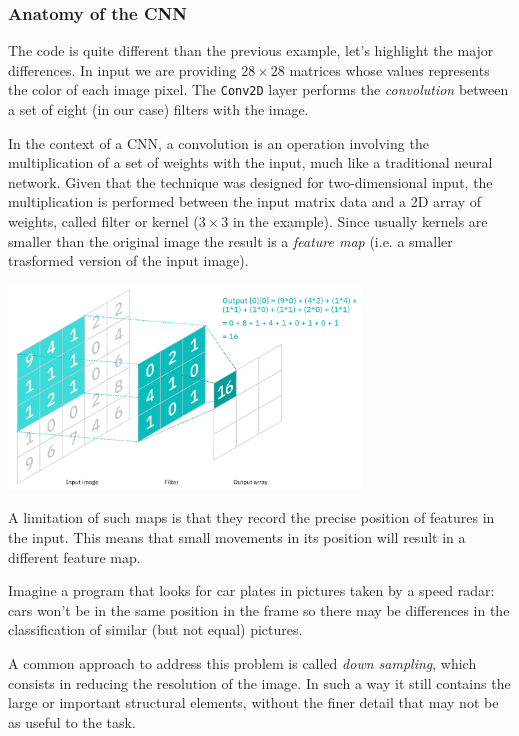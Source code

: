 \begin{attention}
\subsubsection{Anatomy of the CNN}

The code is quite different than the previous example, let's highlight the major differences.
In input we are providing $28\times 28$ matrices whose values represents the color of each image pixel. 
The \texttt{Conv2D} layer performs the \emph{convolution} between a set of eight (in our case) filters with the image. 

In the context of a CNN, a convolution is an operation involving the multiplication of a set of weights with the input, much like a traditional neural network. Given that the technique was designed for two-dimensional input, the multiplication is performed between the input matrix data and a 2D array of weights, called filter or kernel ($3\times 3$ in the example). Since usually kernels are smaller than the original image the result is a \emph{feature map} (i.e. a smaller trasformed version of the input image).
\newline

\begin{center}
\includegraphics[width=0.7\textwidth]{figures/convolution}
\end{center}

A limitation of such maps is that they record the precise position of features in the input. This means that small movements in its position will result in a different feature map. 

Imagine a program that looks for car plates in pictures taken by a speed radar: cars won't be in the same position in the frame so there may be differences in the classification of similar (but not equal) pictures.

A common approach to address this problem is called \emph{down sampling}, which consists in reducing the resolution of the image. In such a way it still contains the large or important structural elements, without the finer detail that may not be as useful to the task.


\end{attention}
